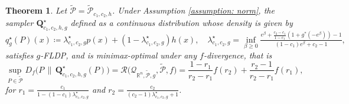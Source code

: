 \documentclass[accepted]{article}
\theoremstyle{plain} %
\newtheorem{theorem}{Theorem}[section]
\theoremstyle{definition}
\theoremstyle{remark}
\newcommand{\bQ}{\mathbf{Q}}
\newcommand{\R}{\mathbb{R}}
\newcommand{\X}{\mathcal{X}}
\begin{document}
\begin{theorem}\label{thm: continuous global functional} 
Let $\tilde{\mathcal{P}}=\tilde{\mathcal{P}}_{c_1,c_2,h}$. Under Assumption \ref{assumption: norm}, the sampler $\mathbf{Q}_{c_1,c_2,h,g}^\star$ defined as a continuous distribution whose density is given by
\begin{equation}\label{eqn: continuous global functional opt mech}
   q^\star_g(P) (x)\coloneqq \lambda^\star_{c_1,c_2,g} p(x) + \left(1 - \lambda^\star_{c_1,c_2,g}\right) h(x), \quad \lambda^\star_{c_1,c_2,g} = \inf_{\beta \geq 0} 
\tfrac{e^\beta + \frac{c_2 - c_1}{1 - c_1} ( 1 + g^*(-e^\beta)) - 1}
     {(1 - c_1)e^\beta + c_2 - 1},
\end{equation}
satisfies $g$-FLDP, and is minimax-optimal under any \( f \)-divergence, that is
\begin{equation}\label{eqn: continuous global functional optimal value}
    \sup_{P \in \tilde{\mathcal{P}}} D_f\big(P \,\|\, \bQ^\star_{c_1,c_2,h,g}(P)\big)
    = \mathcal{R}\big(\mathcal{Q}_{\mathbb{R}^n, \tilde{\mathcal{P}}, g}, \tilde{\mathcal{P}}, f\big)
    = \frac{1 - r_1}{r_2 - r_1} f(r_2) + \frac{r_2 - 1}{r_2 - r_1} f(r_1),
\end{equation}
for $r_1=\frac{c_1}{1-(1-c_1)\lambda_{c_1,c_2,g}^\star}$ and $r_2=\frac{c_2}{(c_2-1)\lambda_{c_1,c_2,g}^\star+1}$.
\end{theorem}
\end{document}
